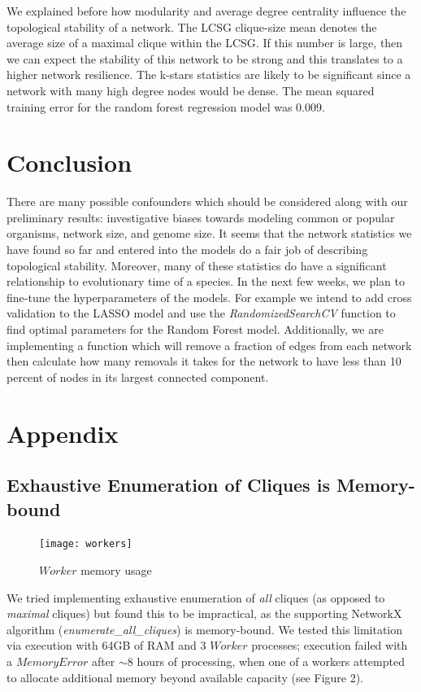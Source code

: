 \documentclass[12pt]{article}
\begin{document}
We explained before how modularity and average degree centrality influence the topological stability of a network. The LCSG clique-size mean denotes the average size of a maximal clique within the LCSG. If this number is large, then we can expect the stability of this network to be strong and this translates to a higher network resilience. The k-stars statistics are likely to be significant since a network with many high degree nodes would be dense. The mean squared training error for the random forest regression model was 0.009.

\section{Conclusion}
There are many possible confounders which should be considered along with our preliminary results: investigative biases towards modeling common or popular organisms, network size, and genome size. It seems that the network statistics we have found so far and entered into the models do a fair job of describing topological stability. Moreover, many of these statistics do have a significant relationship to evolutionary time of a species. In the next few weeks, we plan to fine-tune the hyperparameters of the models. For example we intend to add cross validation to the LASSO model and use the \textit{RandomizedSearchCV} function to find optimal parameters for the Random Forest model. Additionally, we are implementing a function which will remove a fraction of edges from each network then calculate how many removals it takes for the network to have less than 10 percent of nodes in its largest connected component. 
\section{Appendix}
\subsection{Exhaustive Enumeration of Cliques is Memory-bound}
\begin{figure}
  \vspace{-20pt}
  \begin{center}
    \texttt{[image: workers]}
  \end{center}
  \vspace{-20pt}
  \caption{$Worker$ memory usage}
  \vspace{-10pt}
\end{figure}
We tried implementing exhaustive enumeration of \textit{all} cliques (as opposed to \textit{maximal} cliques) but found this to be impractical, as the supporting NetworkX algorithm (\textit{enumerate\_all\_cliques}) is memory-bound. We tested this limitation via execution with 64GB of RAM and 3 $Worker$ processes; execution failed with a $MemoryError$ after $\sim8$ hours of processing, when one of a workers attempted to allocate additional memory beyond available capacity (see Figure 2).
\end{document}
